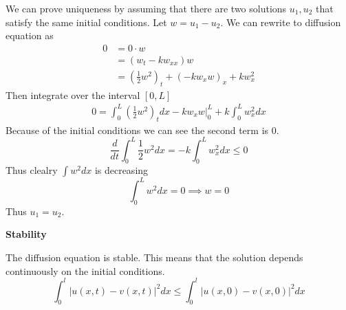 \documentclass[answers,12pt,addpoints]{exam}
\begin{document}
    \begin{solution}
        We can prove uniqueness by assuming that there are two solutions $u_1, u_2$ that satisfy the same initial conditions. Let $w = u_1 - u_2$. We can rewrite to diffusion equation as
        \begin{align*}
            0 &= 0 \cdot w\\
            &= (w_t - k w_{xx})w\\
            &= (\frac{1}{2} w^2)_t + (-kw_x w)_x + k w_x^2
        \end{align*}
        Then integrate over the interval $[0, L]$ 
        \begin{align*}
            0 = \int_{0}^{L} (\frac{1}{2} w^2)_t dx - k w_x w |_0^L + k \int_{0}^{L} w_x^2 dx
        \end{align*}
        Because of the initial conditions we can see the second term is 0. $$ \frac{d}{dt} \int_{0}^{L} \frac{1}{2} w^2 dx = -k \int_{0}^{L} w_x^2 dx \leq 0$$
        Thus clealry $\int w^2 dx$ is decreasing \\
        $$ \int_{0}^{L} w^2 dx = 0 \implies w = 0$$
        Thus $u_1 = u_2$.
    \end{solution}
    \textbf{Stability}
    \begin{theorem}
        The diffusion equation is stable. This means that the solution depends continuously on the initial conditions.
        $$ \int_0^l |u(x, t) - v(x, t)|^2 dx \leq \int_0^l |u(x, 0) - v(x, 0)|^2 dx$$
    \end{theorem}
\end{document}
